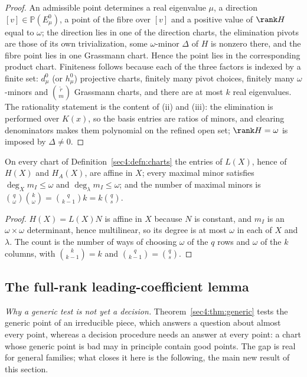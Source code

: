 \begin{proof}
An admissible point determines a real eigenvalue $\mu$, a direction $[v]\in\mathbb P(E_\mu^0)$, a point
of the fibre over $[v]$ and a positive value of $\rank H$ equal to $\omega$; the direction lies in one
of the direction charts, the elimination pivots are those of its own trivialization, some
$\omega$-minor $\Delta$ of $H$ is nonzero there, and the fibre point lies in one Grassmann chart. Hence
the point lies in the corresponding product chart. Finiteness follows because each of the three factors
is indexed by a finite set: $d_\mu^0$ (or $h_\mu^0$) projective charts, finitely many pivot choices,
finitely many $\omega$-minors and $\binom{\widetilde r}{m}$ Grassmann charts, and there are at most $k$
real eigenvalues. The rationality statement is the content of (ii) and (iii): the elimination is
performed over $K(x)$, so the basis entries are ratios of minors, and clearing denominators makes them
polynomial on the refined open set; $\rank H=\omega$ is imposed by $\Delta\ne0$.
\end{proof}

\begin{lem}
\label{sec4:lem:minorcount}
On every chart of Definition~\ref{sec4:defn:charts} the entries of $L(X)$, hence of $H(X)$ and
$H_A(X)$, are affine in $X$; every maximal minor satisfies $\deg_X m_I\le\omega$ and
$\deg_\lambda m_I\le\omega$; and the number of maximal minors is
$\binom{q}{\omega}\binom{k}{\omega}=\binom{q}{k-1}k=k\binom{q}{s}$.
\end{lem}

\begin{proof}
$H(X)=L(X)N$ is affine in $X$ because $N$ is constant, and $m_I$ is an $\omega\times\omega$
determinant, hence multilinear, so its degree is at most $\omega$ in each of $X$ and $\lambda$. The
count is the number of ways of choosing $\omega$ of the $q$ rows and $\omega$ of the $k$ columns,
with $\binom{k}{k-1}=k$ and $\binom{q}{k-1}=\binom{q}{s}$.
\end{proof}

\subsection{The full-rank leading-coefficient lemma}
\label{sec4:fullrank}

\emph{Why a generic test is not yet a decision.} Theorem~\ref{sec4:thm:generic} tests the generic point
of an irreducible piece, which answers a question about almost every point, whereas a decision
procedure needs an answer at every point: a chart whose generic point is bad may in principle contain
good points. The gap is real for general families; what closes it here is the following, the main new
result of this section.

